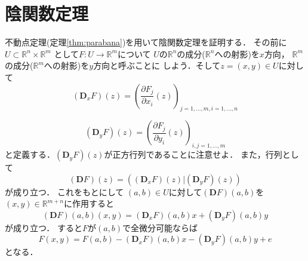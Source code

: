 \documentclass[leqno, a4paper, 12pt]{jsarticle}
\newcommand{\rr}{\mathbb{R}}
\newcommand{\ddd}{\mathbf{D}}
\begin{document}
\section{陰関数定理}
不動点定理(定理\ref{thm:parabana})を用いて陰関数定理を証明する．
その前に$U\subset \rr^{n}\times \rr^{m}$
として$F: U\to \rr^{m}$について
$U$の$\rr^{n}$の成分($\rr^{n}$への射影)を$x$方向，
$\rr^{m}$の成分($\rr^{m}$への射影)を$y$方向と呼ぶことに
しよう．そして$z=(x, y)\in U$に対して
\[
(\ddd_{x} F)(z)=\left(
\frac{\partial F_{j}}{\partial x_{i}}(z)
\right)_{j=1, \dots, m, i=1, \dots, n}
\]

\[
(\ddd_{y} F)(z)=\left(
\frac{\partial F_{j}}{\partial y_{i}}(z)
\right)_{i, j=1, \dots, m}
\]
と定義する．$(\ddd_{y} F)(z)$が正方行列であることに注意せよ．
また，行列として
\[
(\ddd F)(z)=((\ddd_{x}F)(z)|(\ddd_{y}F)(z))
\]
が成り立つ．
これをもとにして
$(a, b)\in U$に対して$(\ddd F)(a, b)$を
$(x, y)\in \rr^{{m+n}}$に作用すると
\[
(\ddd F)(a, b)(x, y)
=(\ddd_{x}F)(a, b)x+(\ddd_{y}F)(a, b)y
\]
が成り立つ．
すると$F$が$(a, b)$で全微分可能ならば
\[
F(x, y)
=
F(a, b)-(\ddd_{x}F)(a, b)x-(\ddd_{y}F)(a, b)y
+e
\]
となる．
\end{document}
